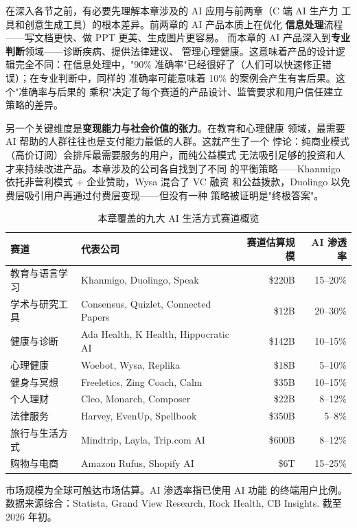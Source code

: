 在深入各节之前，有必要先理解本章涉及的 AI 应用与前两章（C 端 AI 生产力
工具和创意生成工具）的根本差异。前两章的 AI 产品本质上在优化
\textbf{信息处理}流程——写文档更快、做 PPT 更美、生成图片更容易。
而本章的 AI 产品深入到\textbf{专业判断}领域——诊断疾病、提供法律建议、
管理心理健康。这意味着产品的设计逻辑完全不同：在信息处理中，"90\%
准确率"已经很好了（人们可以快速修正错误）；在专业判断中，同样的
准确率可能意味着 10\% 的案例会产生有害后果。这个"准确率与后果的
乘积"决定了每个赛道的产品设计、监管要求和用户信任建立策略的差异。

另一个关键维度是\textbf{变现能力与社会价值的张力}。在教育和心理健康
领域，最需要 AI 帮助的人群往往也是支付能力最低的人群。这就产生了一个
悖论：纯商业模式（高价订阅）会排斥最需要服务的用户，而纯公益模式
无法吸引足够的投资和人才来持续改进产品。本章涉及的公司各自找到了不同
的平衡策略——Khanmigo 依托非营利模式 + 企业赞助，Wysa 混合了 VC 融资
和公益拨款，Duolingo 以免费层吸引用户再通过付费层变现——但没有一种
策略被证明是"终极答案"。

\begin{table}[htbp]
\centering
\caption{本章覆盖的九大 AI 生活方式赛道概览}
\label{tab:ch8-overview}
\small
\begin{tabularx}{\textwidth}{l X r r}
\toprule
\rowcolor{figLightGray}
\textbf{赛道} & \textbf{代表公司} & \textbf{赛道估算规模} & \textbf{AI 渗透率} \\
\midrule
教育与语言学习  & Khanmigo, Duolingo, Speak     & \$220B   & 15--20\% \\
学术与研究工具  & Consensus, Quizlet, Connected Papers  & \$12B  & 20--30\% \\
健康与诊断      & Ada Health, K Health, Hippocratic AI  & \$142B & 10--15\% \\
心理健康        & Woebot, Wysa, Replika         & \$18B    & 5--10\%  \\
健身与冥想      & Freeletics, Zing Coach, Calm  & \$35B    & 10--15\% \\
个人理财        & Cleo, Monarch, Composer        & \$22B    & 8--12\%  \\
法律服务        & Harvey, EvenUp, Spellbook      & \$350B   & 5--8\%   \\
旅行与生活方式  & Mindtrip, Layla, Trip.com AI   & \$600B   & 8--12\%  \\
购物与电商      & Amazon Rufus, Shopify AI       & \$6T     & 15--25\% \\
\bottomrule
\end{tabularx}

\medskip
\noindent \small 市场规模为全球可触达市场估算。AI 渗透率指已使用 AI 功能
的终端用户比例。数据来源综合：Statista, Grand View Research,
Rock Health, CB Insights. 截至 2026 年初。
\end{table}



